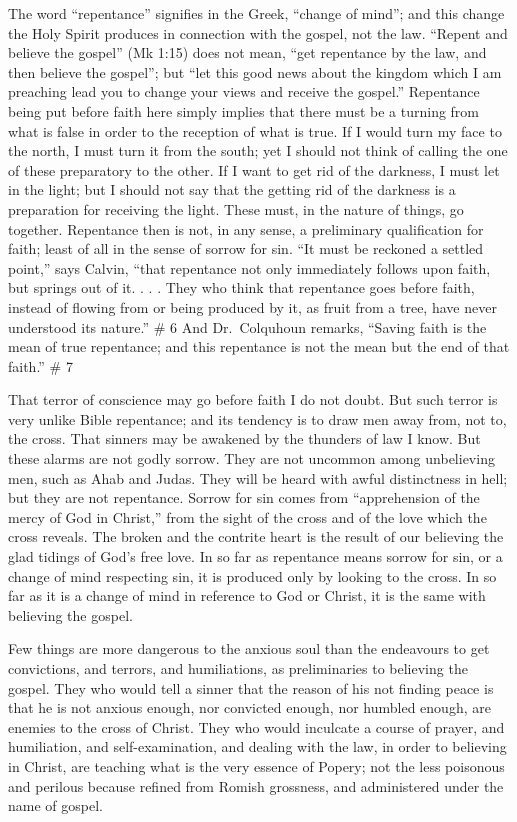 \documentclass[
]{book}
\begin{document}
The word ``repentance'' signifies in the Greek, ``change of mind''; and this change the Holy Spirit produces in connection with the gospel, not the law. ``Repent and believe the gospel'' (Mk 1:15) does not mean, ``get repentance by the law, and then believe the gospel''; but ``let this good news about the kingdom which I am preaching lead you to change your views and receive the gospel.'' Repentance being put before faith here simply implies that there must be a turning from what is false in order to the reception of what is true. If I would turn my face to the north, I must turn it from the south; yet I should not think of calling the one of these preparatory to the other. If I want to get rid of the darkness, I must let in the light; but I should not say that the getting rid of the darkness is a preparation for receiving the light. These must, in the nature of things, go together. Repentance then is not, in any sense, a preliminary qualification for faith; least of all in the sense of sorrow for sin. ``It must be reckoned a settled point,'' says Calvin, ``that repentance not only immediately follows upon faith, but springs out of it. . . . They who think that repentance goes before faith, instead of flowing from or being produced by it, as fruit from a tree, have never understood its nature.''
\# 6
And Dr.~Colquhoun remarks, ``Saving faith is the mean of true repentance; and this repentance is not the mean but the end of that faith.''
\# 7

That terror of conscience may go before faith I do not doubt. But such terror is very unlike Bible repentance; and its tendency is to draw men away from, not to, the cross. That sinners may be awakened by the thunders of law I know. But these alarms are not godly sorrow. They are not uncommon among unbelieving men, such as Ahab and Judas. They will be heard with awful distinctness in hell; but they are not repentance. Sorrow for sin comes from ``apprehension of the mercy of God in Christ,'' from the sight of the cross and of the love which the cross reveals. The broken and the contrite heart is the result of our believing the glad tidings of God's free love. In so far as repentance means sorrow for sin, or a change of mind respecting sin, it is produced only by looking to the cross. In so far as it is a change of mind in reference to God or Christ, it is the same with believing the gospel.

Few things are more dangerous to the anxious soul than the endeavours to get convictions, and terrors, and humiliations, as preliminaries to believing the gospel. They who would tell a sinner that the reason of his not finding peace is that he is not anxious enough, nor convicted enough, nor humbled enough, are enemies to the cross of Christ. They who would inculcate a course of prayer, and humiliation, and self-examination, and dealing with the law, in order to believing in Christ, are teaching what is the very essence of Popery; not the less poisonous and perilous because refined from Romish grossness, and administered under the name of gospel.
\end{document}
